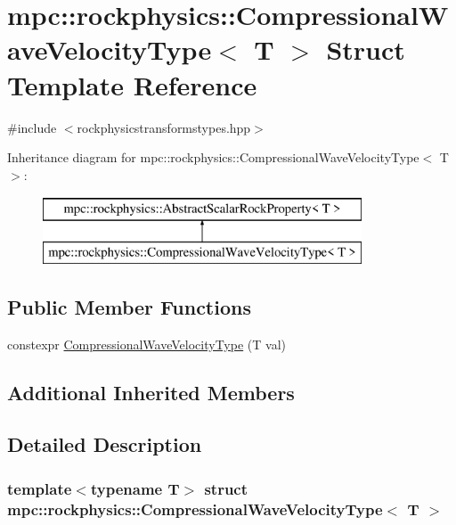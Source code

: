 \hypertarget{structmpc_1_1rockphysics_1_1_compressional_wave_velocity_type}{}\section{mpc\+:\+:rockphysics\+:\+:Compressional\+Wave\+Velocity\+Type$<$ T $>$ Struct Template Reference}
\label{structmpc_1_1rockphysics_1_1_compressional_wave_velocity_type}


{\ttfamily \#include $<$rockphysicstransformstypes.\+hpp$>$}

Inheritance diagram for mpc\+:\+:rockphysics\+:\+:Compressional\+Wave\+Velocity\+Type$<$ T $>$\+:\begin{figure}[H]
\begin{center}
\leavevmode
\includegraphics[height=2.000000cm]{structmpc_1_1rockphysics_1_1_compressional_wave_velocity_type}
\end{center}
\end{figure}
\subsection*{Public Member Functions}
\begin{DoxyCompactItemize}
\item 
constexpr \mbox{\hyperlink{structmpc_1_1rockphysics_1_1_compressional_wave_velocity_type_a5d7d3be3c8f5fc734d5648b9df46e24b}{Compressional\+Wave\+Velocity\+Type}} (T val)
\end{DoxyCompactItemize}
\subsection*{Additional Inherited Members}


\subsection{Detailed Description}
\subsubsection*{template$<$typename T$>$\newline
struct mpc\+::rockphysics\+::\+Compressional\+Wave\+Velocity\+Type$<$ T $>$}



